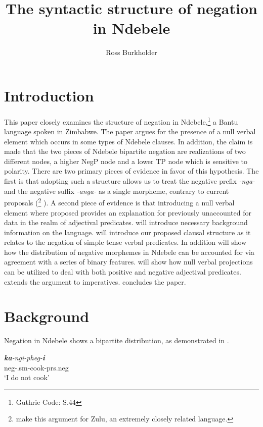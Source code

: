\documentclass[output=paper]{langsci/langscibook}
\title{The syntactic structure of negation in Ndebele}
\author{%
 Ross Burkholder \affiliation{University of Chicago}
}
\newcommand{\nga}[0]{\textit{-nga- }}
\begin{document}
 

  

\section{Introduction}\label{sec:burkholder:1}

This paper closely examines the structure of negation in Ndebele,\footnote{Guthrie Code: S.44} a Bantu language spoken in Zimbabwe. The paper argues for the presence of a null verbal element which occurs in some types of Ndebele clauses. In addition, the claim is made that the two pieces of Ndebele bipartite negation are realizations of two different nodes, a higher NegP node and a lower TP node which is sensitive to polarity. There are two primary pieces of evidence in favor of this hypothesis. The first is that adopting such a structure allows us to treat the negative prefix \nga and the negative suffix \textit{-anga-} as a single morpheme, contrary to current proposals (\citealt{Buell2004,Buell2005}\footnote{\citet{Buell2004,Buell2005} make this argument for Zulu, an extremely closely related language.} \citealt{Khumalo1981,Khumalo1982,Sibanda2004}). A second piece of evidence is that introducing a null verbal element where proposed provides an explanation for previously unaccounted for data in the realm of adjectival predicates.  will introduce necessary background information on the language.   will introduce our proposed clausal structure as it relates to the negation of simple tense verbal predicates. In addition  will show how the distribution of negative morphemes in Ndebele can be accounted for via agreement with a series of binary features.  will show how null verbal projections can be utilized to deal with both positive and negative adjectival predicates.  extends the argument to imperatives.  concludes the paper. 


\section{Background}\label{sec:burkholder:1.1}
Negation in Ndebele shows a bipartite distribution, as demonstrated in .


\begin{exe}
\ex\label{ex:burkholder:1}
\gll  \textit{\textbf {ka}-ngi-pheg-\textbf{i}}\\
          {\sc neg}-.{\sc sm}-cook-{\sc prs.neg}\\
    \glt `I do not cook'
\end{exe}
\end{document}
